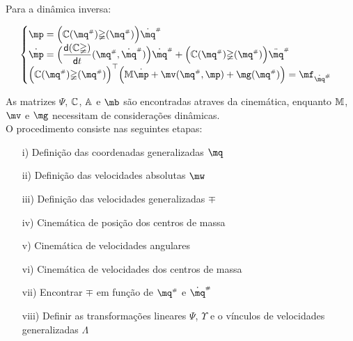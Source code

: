 Para a din\^amica inversa:

\begin{equation} \label{eq:SerialInverseDinamics}
\begin{cases}
\mp = \Big( \mC(\mq\ssh) \mathbb{\Psi} (\mq\ssh) \Big) \dot{\mq}\ssh \\
\dot{\mp} = \Big( \displaystyle\frac{\dd (\mC \mathbb{\Psi})}{\dd t} (\mq\ssh, \dot{\mq}\ssh) \Big) \dot{\mq}\ssh + \Big( \mC(\mq\ssh) \mathbb{\Psi} (\mq\ssh) \Big) \ddot{\mq}\ssh \\
\Big( \mC(\mq\ssh) \mathbb{\Psi} (\mq\ssh) \Big)^\top \Big( \mM \dot{\mp} + \mv (\mq\ssh,\mp) + \mg (\mq\ssh) \Big) = \mf_{\dot{\mq}\ssh} \\
\end{cases}
\end{equation}



As matrizes $\mathbb{\Psi}$, $\mathbb{C}$, $\mathbb{A}$ e $\mb$ s\~ao encontradas atraves da cinem\'atica, enquanto $\mathbb{M}$, $\mv$ e $\mg$ necessitam de considera\c{c}\~oes din\^amicas. \\

O procedimento consiste nas seguintes etapas:

\begin{itemize}
\item[i)] Defini\c{c}\~ao das coordenadas generalizadas $\mq$
\item[ii)] Defini\c{c}\~ao das velocidades absolutas  $\mw$
\item[iii)] Defini\c{c}\~ao das velocidades generalizadas $\mp$
\item[iv)] Cinem\'atica de posição dos centros de massa
\item[v)] Cinem\'atica de velocidades angulares
\item[vi)] Cinem\'atica de velocidades dos centros de massa
\item[vii)] Encontrar $\mp$ em função de $\mq\ssh$ e $\dot{\mq}\ssh$
\item[viii)] Definir as transforma\c{c}\~oes lineares $\mathbb{\Psi}$, $\mathbb{\Upsilon}$ e o vínculos de velocidades generalizadas $\mathbb{\Lambda}$
\end{itemize}


